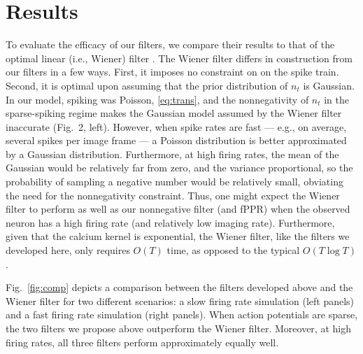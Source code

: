 \section{Results} \label{sec:results} %

To evaluate the efficacy of our filters, we compare their results to that of the optimal linear (i.e., Wiener) filter \cite{Wiener49}.  The Wiener filter differs in construction from our filters in a few ways.  First, it imposes no constraint on on the spike train.  Second, it is optimal upon assuming that the prior distribution of $n_t$ is Gaussian. In our model, spiking was Poisson, \eqref{eq:trans}, and the nonnegativity of $n_t$ in the sparse-spiking regime makes the Gaussian model assumed by the Wiener filter inaccurate (Fig.\ 2, left).  However, when spike rates are fast --- e.g., on average, several spikes per image frame --- a Poisson distribution is better approximated by a Gaussian distribution.  Furthermore, at high firing rates, the mean of the Gaussian would be relatively far from zero, and the variance proportional, so the probability of sampling a negative number would be relatively small, obviating the need for the nonnegativity constraint. Thus, one might expect the Wiener filter to perform as well as our nonnegative filter (and fPPR) when the observed neuron has a high firing rate (and relatively low imaging rate). Furthermore, given that the calcium kernel is exponential, the Wiener filter, like the filters we developed here, only requires $O(T)$ time, as opposed to the typical $O(T\log T)$.

Fig.\ \ref{fig:comp} depicts a comparison between the filters developed above and the Wiener filter for two different scenarios: a slow firing rate simulation (left panels) and a fast firing rate simulation (right panels). When action potentials are sparse, the two filters we propose above outperform the Wiener filter. Moreover, at high firing rates,  all three filters perform approximately equally well. 


